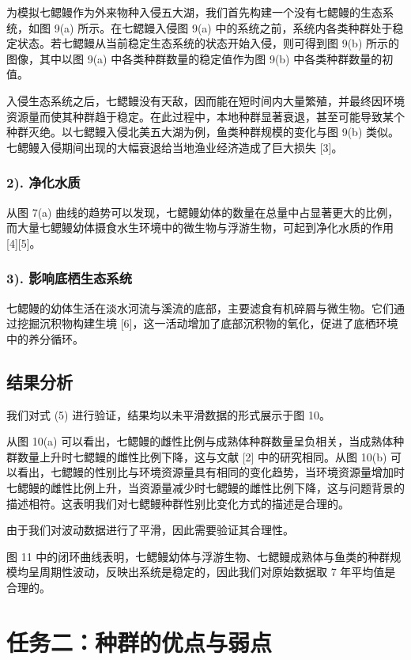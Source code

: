 \documentclass[11pt,a4paper]{ctexart}
\begin{document}
为模拟七鳃鳗作为外来物种入侵五大湖，我们首先构建一个没有七鳃鳗的生态系统，如图 9(a) 所示。在七鳃鳗入侵图 9(a) 中的系统之前，系统内各类种群处于稳定状态。若七鳃鳗从当前稳定生态系统的状态开始入侵，则可得到图 9(b) 所示的图像，其中以图 9(a) 中各类种群数量的稳定值作为图 9(b) 中各类种群数量的初值。

入侵生态系统之后，七鳃鳗没有天敌，因而能在短时间内大量繁殖，并最终因环境资源量而使其种群趋于稳定。在此过程中，本地种群显著衰退，甚至可能导致某个种群灭绝。以七鳃鳗入侵北美五大湖为例，鱼类种群规模的变化与图 9(b) 类似。七鳃鳗入侵期间出现的大幅衰退给当地渔业经济造成了巨大损失 [3]。

\subsubsection*{2). 净化水质}

从图 7(a) 曲线的趋势可以发现，七鳃鳗幼体的数量在总量中占显著更大的比例，而大量七鳃鳗幼体摄食水生环境中的微生物与浮游生物，可起到净化水质的作用 [4][5]。

\subsubsection*{3). 影响底栖生态系统}

七鳃鳗的幼体生活在淡水河流与溪流的底部，主要滤食有机碎屑与微生物。它们通过挖掘沉积物构建生境 [6]，这一活动增加了底部沉积物的氧化，促进了底栖环境中的养分循环。

\subsection{结果分析}

我们对式 (5) 进行验证，结果均以未平滑数据的形式展示于图 10。

从图 10(a) 可以看出，七鳃鳗的雌性比例与成熟体种群数量呈负相关，当成熟体种群数量上升时七鳃鳗的雌性比例下降，这与文献 [2] 中的研究相同。从图 10(b) 可以看出，七鳃鳗的性别比与环境资源量具有相同的变化趋势，当环境资源量增加时七鳃鳗的雌性比例上升，当资源量减少时七鳃鳗的雌性比例下降，这与问题背景的描述相符。这表明我们对七鳃鳗种群性别比变化方式的描述是合理的。

由于我们对波动数据进行了平滑，因此需要验证其合理性。

图 11 中的闭环曲线表明，七鳃鳗幼体与浮游生物、七鳃鳗成熟体与鱼类的种群规模均呈周期性波动，反映出系统是稳定的，因此我们对原始数据取 7 年平均值是合理的。
\section{任务二：种群的优点与弱点}
\end{document}
